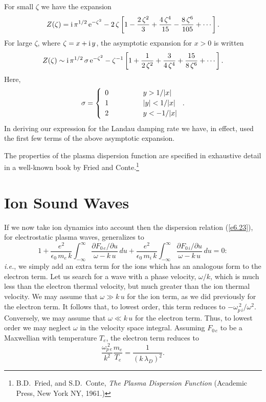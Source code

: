 For small $\zeta$ we have the expansion
\begin{equation}
Z(\zeta) = {\rm i}\,\pi^{1/2}\,{\rm e}^{-\zeta^2}-2\,\zeta\left[
1-\frac{2\,\zeta^2}{3} + \frac{4\,\zeta^4}{15} - \frac{8\,\zeta^6}{105}
+\cdots\right].
\end{equation}
For large $\zeta$, where $\zeta=x+{\rm i}\,y$, the asymptotic expansion
for $x>0$ is written
\begin{equation}\label{e6.46}
Z(\zeta) \sim {\rm i}\,\pi^{1/2}\,\sigma\,{\rm e}^{-\zeta^2}
-\zeta^{-1}\left[1+\frac{1}{2\,\zeta^2} + \frac{3}{4\,\zeta^4}+\frac{15}{8\,\zeta^6}
+\cdots\right].
\end{equation}
Here,
\begin{equation}
\sigma = \left\{
\begin{array}{lll}
0&\mbox{\hspace{1cm}}& y>1/|x|\\[0.5ex]
1&& |y|<1/|x|\\[0.5ex]
2&&y< -1/|x|
\end{array}
 \right..
\end{equation}
In deriving our expression for the Landau damping rate we have, in effect, used the
first few terms of the above asymptotic expansion.

The properties of the plasma dispersion function are specified in exhaustive
detail in a well-known book by Fried and Conte.\footnote{B.D.~Fried, and
S.D.~Conte, {\em The Plasma Dispersion Function} (Academic Press, New York NY,
1961.)}

\section{Ion Sound Waves}\label{s6.5}
If we now take ion dynamics into account then the dispersion relation (\ref{e6.23}),
for electrostatic plasma waves, generalizes to
\begin{equation}
1 + \frac{e^2}{\epsilon_0\,m_e\,k}\int_{-\infty}^{\infty}\frac{\partial F_{0\,e}/
\partial u}{\omega - k\,u}\,du + \frac{e^2}{\epsilon_0\,m_i\,k}
\int_{-\infty}^{\infty}\frac{\partial F_{0\,i}/\partial u}{\omega-k\,u}\,du = 0:
\end{equation}
{\em i.e.}, we simply add an extra term for the ions which has an
analogous form to the electron term. Let us search for a wave with
a phase velocity, $\omega/k$, which is much less than the electron thermal
velocity, but much greater than the ion thermal velocity. We may assume
that $\omega\gg k\,u$ for the ion term, as we did previously for the
electron term. It follows that, to
lowest order, this term reduces to $-\omega_{p\,i}^{~2}/\omega^2$. Conversely, we
may assume that $\omega\ll k\,u$ for the electron term. Thus, to
lowest order we may neglect $\omega$ in the velocity space
integral. Assuming $F_{0\,e}$
to be a Maxwellian with temperature $T_e$, the electron term reduces to
\begin{equation}
\frac{{\omega}_{p\,e}^{~2}}{k^2}\frac{m_e}{T_e} = \frac{1}{(k\,\lambda_D)^2}.
\end{equation}

